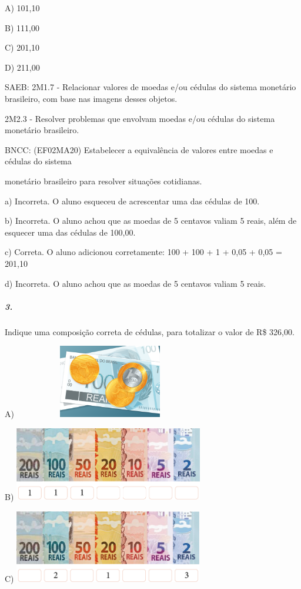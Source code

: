 A) 101,10

B) 111,00

C) 201,10

D) 211,00

SAEB: 2M1.7 - Relacionar valores de moedas e/ou cédulas do sistema
monetário brasileiro, com base nas imagens desses objetos.

2M2.3 - Resolver problemas que envolvam moedas e/ou cédulas do sistema
monetário brasileiro.

BNCC: (EF02MA20) Estabelecer a equivalência de valores entre moedas e
cédulas do sistema

monetário brasileiro para resolver situações cotidianas.

a) Incorreta. O aluno esqueceu de acrescentar uma das cédulas de 100.

b) Incorreta. O aluno achou que as moedas de 5 centavos valiam 5 reais,
além de esquecer uma das cédulas de 100,00.

c) Correta. O aluno adicionou corretamente: 100 + 100 + 1 + 0,05 + 0,05
= 201,10

d) Incorreta. O aluno achou que as moedas de 5 centavos valiam 5 reais.

\subparagraph{3.}\label{section-67}

Indique uma composição correta de cédulas, para totalizar o valor de R\$
326,00.

A) \includegraphics[width=3.30208in,height=1.25892in]{media/image79.png}

B) \includegraphics[width=3.24468in,height=1.27083in]{media/image80.png}

C) \includegraphics[width=3.23529in,height=1.26042in]{media/image81.png}

